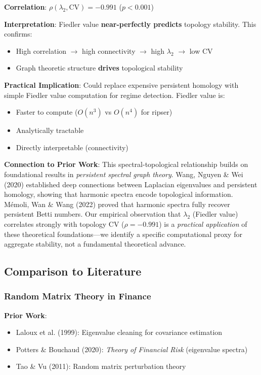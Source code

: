 \textbf{Correlation}: $\rho(\lambda_2, \text{CV}) = \mathbf{-0.991}$ ($p < 0.001$)

\textbf{Interpretation}: Fiedler value \textbf{near-perfectly predicts} topology stability. This confirms:
\begin{itemize}
\item High correlation $\rightarrow$ high connectivity $\rightarrow$ high $\lambda_2$ $\rightarrow$ low CV
\item Graph theoretic structure \textbf{drives} topological stability
\end{itemize}

\textbf{Practical Implication}: Could replace expensive persistent homology with simple Fiedler value computation for regime detection. Fiedler value is:
\begin{itemize}
\item Faster to compute ($O(n^3)$ vs $O(n^4)$ for ripser)
\item Analytically tractable
\item Directly interpretable (connectivity)
\end{itemize}

\textbf{Connection to Prior Work}: This spectral-topological relationship builds on foundational results in \textit{persistent spectral graph theory}. Wang, Nguyen \& Wei (2020) established deep connections between Laplacian eigenvalues and persistent homology, showing that harmonic spectra encode topological information. Mémoli, Wan \& Wang (2022) proved that harmonic spectra fully recover persistent Betti numbers. Our empirical observation that $\lambda_2$ (Fiedler value) correlates strongly with topology CV ($\rho = -0.991$) is a \textit{practical application} of these theoretical foundations---we identify a specific computational proxy for aggregate stability, not a fundamental theoretical advance.

\subsection{Comparison to Literature}

\subsubsection{Random Matrix Theory in Finance}

\textbf{Prior Work}:
\begin{itemize}
\item Laloux et al. (1999): Eigenvalue cleaning for covariance estimation
\item Potters \& Bouchaud (2020): \textit{Theory of Financial Risk} (eigenvalue spectra)
\item Tao \& Vu (2011): Random matrix perturbation theory
\end{itemize}

